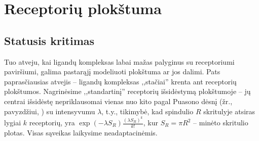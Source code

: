 \documentclass[10pt]{article}
\begin{document}
\section{Receptorių plokštuma}
\subsection{Statusis kritimas}
Tuo atveju, kai ligandų kompleksas labai mažas palyginus su 
receptoriumi paviršiumi, galima pastarąjį modeliuoti plokštuma ar jos dalimi. Pats paprasčiausias atvejis -- ligandų kompleksas ,,stačiai'' krenta ant receptorių plokštumos. Nagrinėsime ,,standartinį''  receptorių išsidėstymą plokštumoje -- jų centrai išsidėstę nepriklausomai vienas nuo kito pagal Puasono dėsnį (žr., pavyzdžiui, \cite{Lange03}) su intensyvumu $\lambda$, t.y., tikimybė, kad spindulio $R$ skritulyje atsiras lygiai $k$ receptorių, yra $ \exp(-\lambda S_R)\frac{(\lambda S_R)^k}{k!} $, kur $S_R = \pi R^2$ -- minėto skritulio plotas. Visas sąveikas laikysime neadaptacinėmis. 


\end{document}
